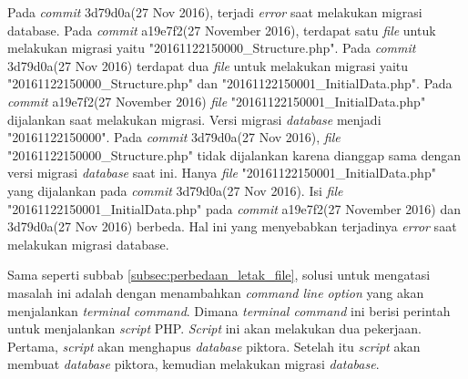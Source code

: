 Pada \textit{commit} 3d79d0a(27 Nov 2016), terjadi \textit{error} saat melakukan migrasi database. Pada \textit{commit} a19e7f2(27 November 2016), terdapat satu \textit{file} untuk melakukan migrasi yaitu "20161122150000\_Structure.php". Pada \textit{commit} 3d79d0a(27 Nov 2016) terdapat dua \textit{file} untuk melakukan migrasi yaitu "20161122150000\_Structure.php" dan "20161122150001\_InitialData.php". Pada \textit{commit} a19e7f2(27 November 2016) \textit{file} "20161122150001\_InitialData.php" dijalankan saat melakukan migrasi. Versi migrasi \textit{database} menjadi "20161122150000". Pada \textit{commit} 3d79d0a(27 Nov 2016), \textit{file} "20161122150000\_Structure.php" tidak dijalankan karena dianggap sama dengan versi migrasi \textit{database} saat ini. Hanya \textit{file} "20161122150001\_InitialData.php" yang dijalankan pada \textit{commit} 3d79d0a(27 Nov 2016). Isi \textit{file} "20161122150001\_InitialData.php" pada \textit{commit} a19e7f2(27 November 2016) dan 3d79d0a(27 Nov 2016) berbeda. Hal ini yang menyebabkan terjadinya \textit{error} saat melakukan migrasi database.  

Sama seperti subbab \ref{subsec:perbedaan_letak_file}, solusi untuk mengatasi masalah ini adalah dengan menambahkan \textit{command line option} yang akan menjalankan \textit{terminal command}. Dimana \textit{terminal command} ini berisi perintah untuk menjalankan \textit{script} PHP. \textit{Script} ini akan melakukan dua pekerjaan. Pertama, \textit{script} akan menghapus \textit{database} piktora. Setelah itu \textit{script} akan membuat \textit{database} piktora, kemudian melakukan migrasi \textit{database}. 
 
